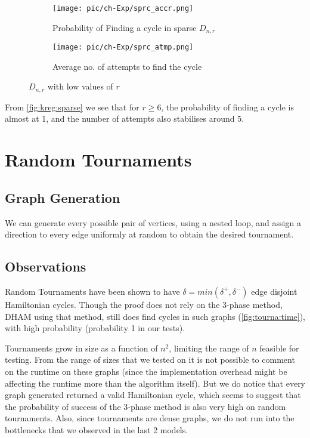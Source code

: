 \begin{figure}[ht]

\begin{subfigure}{\textwidth}
\centering
\texttt{[image: pic/ch-Exp/sprc\_accr.png]}
\caption{Probability of Finding a cycle in sparse $D_{n, r}$}
\label{fig:kreg:spaccr}
\end{subfigure}
\begin{subfigure}{\textwidth}
\centering
\texttt{[image: pic/ch-Exp/sprc\_atmp.png]}
\caption{Average no. of attempts to find the cycle}
\label{fig:kreg:spatmp}
\end{subfigure}

\caption{$D_{n, r}$ with low values of $r$}
\label{fig:kreg:sparse}
\end{figure}

From \autoref{fig:kreg:sparse} we see that for $r \ge 6$, the probability of finding a cycle is almost at 1, and the number of attempts also stabilises around 5. 

\section{Random Tournaments}
\subsection{Graph Generation}
We can generate every possible pair of vertices, using a nested loop, and assign a direction to every edge uniformly at random to obtain the desired tournament.
\subsection{Observations}
Random Tournaments have been shown to have $\delta = min(\delta^+, \delta^-)$ edge disjoint Hamiltonian cycles\cite{kuhn:tourna}. Though the proof does not rely on the 3-phase method, DHAM using that method, still does find cycles in such graphs (\autoref{fig:tourna:time}), with high probability (probability 1 in our tests).

Tournaments grow in size as a function of $n^2$, limiting the range of $n$ feasible for testing. From the range of sizes that we tested on it is not possible to comment on the runtime on these graphs (since the implementation overhead might be affecting the runtime more than the algorithm itself). But we do notice that every graph generated returned a valid Hamiltonian cycle, which seems to suggest that the probability of success of the 3-phase method is also very high on random tournaments.
Also, since tournaments are dense graphs, we do not run into the bottlenecks that we observed in the last 2 models.

